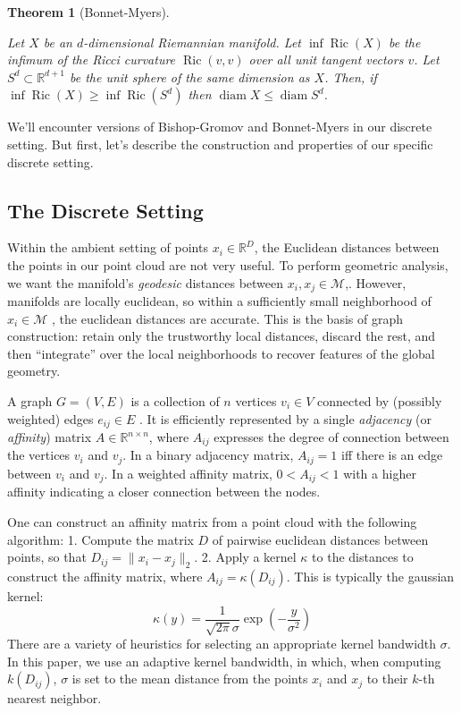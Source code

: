 \documentclass[
  letterpaper,
  DIV=11,
  numbers=noendperiod]{scrartcl}
\theoremstyle{plain}
\newtheorem{theorem}{Theorem}[section]
\theoremstyle{plain}
\theoremstyle{definition}
\theoremstyle{plain}
\theoremstyle{definition}
\theoremstyle{remark}
\begin{document}
\begin{theorem}[Bonnet-Myers]\protect\hypertarget{thm-bonnet-myers}{}\label{thm-bonnet-myers}

Let \(X\) be an \(d\)-dimensional Riemannian manifold. Let
\(\inf \operatorname{Ric}(X)\) be the infimum of the Ricci curvature
\(\operatorname{Ric}(v, v)\) over all unit tangent vectors \(v\). Let
\(S^d \subset \mathbb{R}^{d+1}\) be the unit sphere of the same
dimension as \(X\). Then, if
\(\inf \operatorname{Ric}(X) \geqslant \inf \operatorname{Ric}\left(S^d\right)\)
then \(\operatorname{diam} X \leqslant \operatorname{diam} S^d\).

\end{theorem}

We'll encounter versions of Bishop-Gromov and Bonnet-Myers in our
discrete setting. But first, let's describe the construction and
properties of our specific discrete setting.

\subsection{The Discrete Setting}\label{the-discrete-setting}

Within the ambient setting of points \(x_{i} \in \mathbb{R}^D\), the
Euclidean distances between the points in our point cloud are not very
useful. To perform geometric analysis, we want the manifold's
\emph{geodesic} distances between \(x_{i}, x_{j} \in \mathcal{M}\),.
However, manifolds are locally euclidean, so within a sufficiently small
neighborhood of \(x_{i} \in \mathcal{M}\) , the euclidean distances are
accurate. This is the basis of graph construction: retain only the
trustworthy local distances, discard the rest, and then ``integrate''
over the local neighborhoods to recover features of the global geometry.

A graph \(G = (V, E)\) is a collection of \(n\) vertices \(v_{i} \in V\)
connected by (possibly weighted) edges \(e_{ij} \in E\) . It is
efficiently represented by a single \emph{adjacency} (or
\emph{affinity}) matrix \(A \in \mathbb{R}^{n \times n}\), where
\(A_{ij}\) expresses the degree of connection between the vertices
\(v_{i}\) and \(v_{j}\). In a binary adjacency matrix, \(A_{ij}=1\) iff
there is an edge between \(v_{i}\) and \(v_{j}\). In a weighted affinity
matrix, \(0<A_{ij}<1\) with a higher affinity indicating a closer
connection between the nodes.

One can construct an affinity matrix from a point cloud with the
following algorithm: 1. Compute the matrix \(D\) of pairwise euclidean
distances between points, so that \(D_{ij}=\|x_{i}-x_{j}\|_{2}\). 2.
Apply a kernel \(\kappa\) to the distances to construct the affinity
matrix, where \(A_{ij} = \kappa(D_{ij})\). This is typically the
gaussian kernel: \[
\kappa(y) = \frac{1}{\sqrt{ 2\pi }\sigma}\exp\left( -\frac{y}{\sigma^2} \right)
\] There are a variety of heuristics for selecting an appropriate kernel
bandwidth \(\sigma\). In this paper, we use an adaptive kernel
bandwidth, in which, when computing \(k(D_{ij})\), \(\sigma\) is set to
the mean distance from the points \(x_{i}\) and \(x_{j}\) to their
\(k\)-th nearest neighbor.
\end{document}
